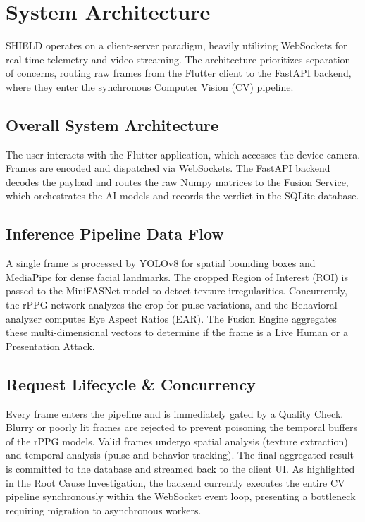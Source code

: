 \documentclass[12pt, a4paper]{report}
\begin{document}
\fi
\chapter{System Architecture}

SHIELD operates on a client-server paradigm, heavily utilizing WebSockets for real-time telemetry and video streaming. The architecture prioritizes separation of concerns, routing raw frames from the Flutter client to the FastAPI backend, where they enter the synchronous Computer Vision (CV) pipeline.

\section{Overall System Architecture}
The user interacts with the Flutter application, which accesses the device camera. Frames are encoded and dispatched via WebSockets. The FastAPI backend decodes the payload and routes the raw Numpy matrices to the Fusion Service, which orchestrates the AI models and records the verdict in the SQLite database.

\section{Inference Pipeline Data Flow}
A single frame is processed by YOLOv8 for spatial bounding boxes and MediaPipe for dense facial landmarks. The cropped Region of Interest (ROI) is passed to the MiniFASNet model to detect texture irregularities. Concurrently, the rPPG network analyzes the crop for pulse variations, and the Behavioral analyzer computes Eye Aspect Ratios (EAR). The Fusion Engine aggregates these multi-dimensional vectors to determine if the frame is a Live Human or a Presentation Attack.

\section{Request Lifecycle \& Concurrency}
Every frame enters the pipeline and is immediately gated by a Quality Check. Blurry or poorly lit frames are rejected to prevent poisoning the temporal buffers of the rPPG models. Valid frames undergo spatial analysis (texture extraction) and temporal analysis (pulse and behavior tracking). The final aggregated result is committed to the database and streamed back to the client UI. As highlighted in the Root Cause Investigation, the backend currently executes the entire CV pipeline synchronously within the WebSocket event loop, presenting a bottleneck requiring migration to asynchronous workers.
\end{document}
